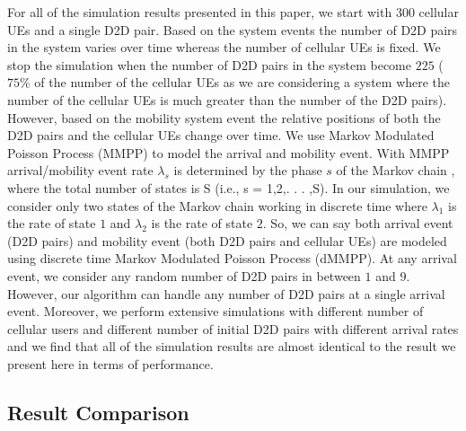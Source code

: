\documentclass[times]{dacauth}
\begin{document}
\noindent


\noindent
For all of the simulation results presented in this paper, we start with $300$ cellular UEs and a single D2D pair. Based on the system events the number of D2D pairs in the system varies over time whereas the number of cellular UEs is fixed. We stop the simulation when the number of D2D pairs in the system become $225$ ( $75\%$ of the number of the cellular UEs as we are considering a system where the number of the cellular UEs is much greater than the number of the D2D pairs). However, based on the mobility system event the relative positions of both the D2D pairs and the cellular UEs change over time. We use Markov Modulated Poisson Process (MMPP)\cite{salvador2003multiscale} to model the arrival and mobility event. With MMPP arrival/mobility event rate $\lambda_s$ is determined by the phase $s$ of the Markov chain \cite{stewart1994introduction}, where the total number of states is S (i.e., s = 1,2,. . . ,S). In our simulation, we consider only two states of the Markov chain working in discrete time where $\lambda_1$ is the rate of state $1$ and $\lambda_2$ is the rate of state $2$. So, we can say both arrival event (D2D pairs) and mobility event (both D2D pairs and cellular UEs) are modeled using discrete time Markov Modulated Poisson Process (dMMPP). At any arrival event, we consider any random number of D2D pairs in between $1$ and $9$. However, our algorithm can handle any number of D2D pairs at a single arrival event. Moreover, we perform extensive simulations with different number of cellular users and different number of initial D2D pairs with different arrival rates and we find that all of the simulation results are almost identical to the result we present here in terms of performance.


\noindent


\subsection{Result Comparison}
\end{document}
